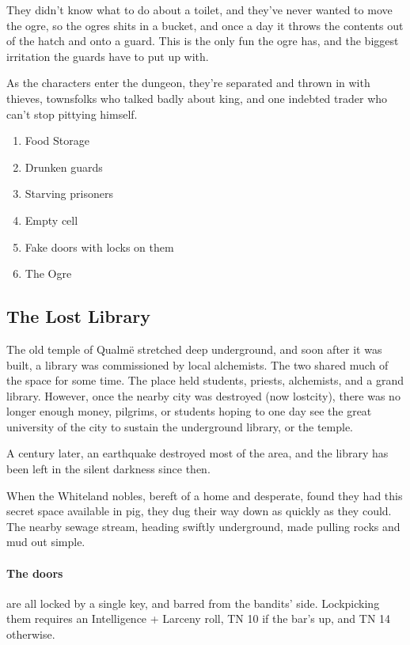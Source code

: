 \begin{multicols}{2}
\begin{boxtext}
\end{boxtext}

\noindent

They didn't know what to do about a toilet, and they've never wanted to move the ogre, so the ogres shits in a bucket, and once a day it throws the contents out of the hatch and onto a guard.
This is the only fun the ogre has, and the biggest irritation the guards have to put up with.

As the characters enter the dungeon, they're separated and thrown in with thieves, townsfolks who talked badly about \gls{king}, and one indebted trader who can't stop pittying himself.

\begin{enumerate}

	\item{Food Storage}
	\item{Drunken guards}
	\item{Starving prisoners}
	\item{Empty cell}
	\item{Fake doors with locks on them}
	\item{The Ogre}

\end{enumerate}



\subsection{The Lost Library}\label{sewers}\setcounter{list}{0}

The old temple of Qualm\"{e} stretched deep underground, and soon after it was built, a library was commissioned by local alchemists.
The two shared much of the space for some time.
The place held students, priests, alchemists, and a grand library.
However, once the nearby city was destroyed (now \gls{lostcity}), there was no longer enough money, pilgrims, or students hoping to one day see the great university of the city to sustain the underground library, or the temple.

A century later, an earthquake destroyed most of the area, and the library has been left in the silent darkness since then.

When the Whiteland nobles, bereft of a home and desperate, found they had this secret space available in \gls{pig}, they dug their way down as quickly as they could.  The nearby sewage stream, heading swiftly underground, made pulling rocks and mud out simple.

\paragraph{The doors} are all locked by a single key, and barred from the bandits' side.
Lockpicking them requires an Intelligence + Larceny roll, TN 10 if the bar's up, and TN 14 otherwise.

\end{multicols}

